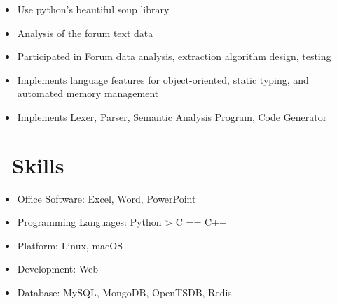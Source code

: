 \documentclass{resume}
\begin{document}
\begin{itemize}
  \item Use python's beautiful soup library
  \item Analysis of the forum text data
  \item Participated in Forum data analysis, extraction algorithm design, testing
\end{itemize}

\begin{itemize}
  \item Implements language features for object-oriented, static typing, and automated memory management
  \item Implements Lexer, Parser, Semantic Analysis Program, Code Generator
\end{itemize}


\section{\faCogs\ Skills}
\begin{itemize}[parsep=0.5ex]
  \item Office Software: Excel, Word, PowerPoint
  \item Programming Languages: Python > C == C++
  \item Platform: Linux, macOS
  \item Development: Web
  \item Database: MySQL, MongoDB, OpenTSDB, Redis
\end{itemize}


%
%
\end{document}
